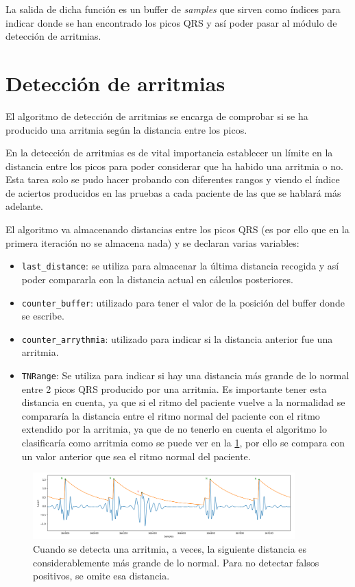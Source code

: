 \FloatBarrier
La salida de dicha función es un buffer de \textit{samples} que sirven como índices para indicar donde se han encontrado
los picos QRS y así poder pasar al módulo de detección de arritmias.

\section{Detección de arritmias}

El algoritmo de detección de arritmias se encarga de comprobar si se ha producido una arritmia según la
distancia entre los picos.

En la detección de arritmias es de vital importancia establecer un límite en la distancia entre los picos
para poder considerar que ha habido una arritmia o no. Esta tarea solo se pudo hacer probando con diferentes
rangos y viendo el índice de aciertos producidos en las pruebas a cada paciente de las que se hablará más adelante. 

El algoritmo va almacenando distancias entre los picos QRS (es por ello que en la primera iteración no se almacena nada)
y se declaran varias variables:

\begin{itemize}
    \item \texttt{last\_distance}: se utiliza para almacenar la última distancia recogida y así poder compararla con la distancia 
    actual en cálculos posteriores.
    \item \texttt{counter\_buffer}: utilizado para tener el valor de la posición del buffer donde se escribe.
    \item \texttt{counter\_arrythmia}: utilizado para indicar si la distancia anterior fue una arritmia.
    \item \texttt{TNRange}: Se utiliza para indicar si hay una distancia más grande de lo normal entre 2 picos QRS producido
    por una arritmia. Es importante tener esta distancia en cuenta, ya que si el ritmo del paciente vuelve a la
    normalidad se compararía la distancia entre el ritmo normal del paciente con el ritmo extendido por la arritmia,
    ya que de no tenerlo en cuenta el algoritmo lo clasificaría como arritmia como se puede ver en la \cref{fig:senial_explicacion_TNRANGE}, por ello se compara con un valor anterior
    que sea el ritmo normal del paciente.
\end{itemize}

\begin{figure}[h!]
    \centering
    \includegraphics[width=0.9\textwidth]{./Images/img_algoritmo/senial_explicacion_TNRANGE.png}
    \caption{Cuando se detecta una arritmia, a veces, la siguiente distancia es considerablemente más grande de lo normal. Para no detectar falsos positivos, se omite esa distancia.}
    \label{fig:senial_explicacion_TNRANGE}
\end{figure}


